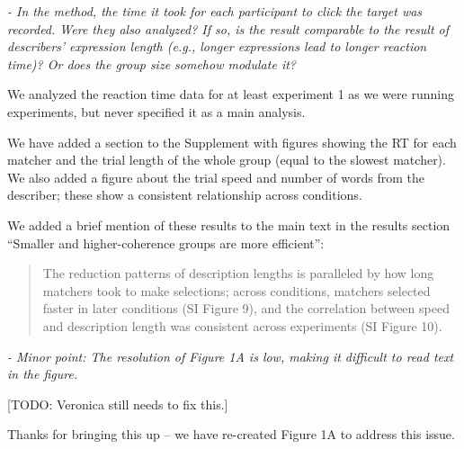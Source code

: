 \documentclass{stanfordletter}
\newcommand{\theysaid}[1]{\begin{leftbar} \noindent 
		\textsl{ #1}\end{leftbar}}
\newcommand{\revised}[1]{\begin{quote}	#1 \end{quote}}
\begin{document}
\begin{letter}{}
          \theysaid{- In the method, the time it took for each participant to click the target was recorded. Were they also analyzed? If so, is the result comparable to the result of describers' expression length (e.g., longer expressions lead to longer reaction time)? Or does the group size somehow modulate it?}
          
          
          We analyzed the reaction time data for at least experiment 1 as we were running experiments, but never specified it as a main analysis. 
          
          We have added a section to the Supplement with figures showing the RT for each matcher and the trial length of the whole group (equal to the slowest matcher). We also added a figure about the trial speed and number of words from the describer; these show a consistent relationship across conditions. 
          
          We added a brief mention of these results to the main text in the results section ``Smaller and higher-coherence groups are more efficient'':
          
          \revised{The reduction patterns of description lengths is paralleled by how long matchers took to make selections; across conditions, matchers selected faster in later conditions (SI Figure 9), and the correlation between speed and description length was consistent across experiments (SI Figure 10). }
          
          \theysaid{- Minor point: The resolution of Figure 1A is low, making it difficult to read text in the figure.}
          
          [TODO: Veronica still needs to fix this.]
          
          Thanks for bringing this up -- we have re-created Figure 1A to address this issue. 
          

\end{letter}
\end{document}
